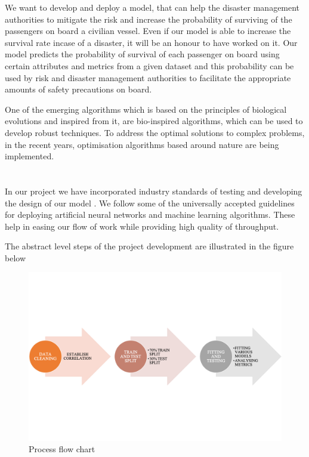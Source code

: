 \documentclass[12pt]{article}
\newcommand{\nd}{\noindent}
\newcommand{\secsize}{\fontsize{15pt}{12pt}\selectfont}
\begin{document}
\nd We want to develop and deploy a model, that can help the disaster management authorities to mitigate the risk and increase the probability of surviving of the passengers on board a civilian vessel. Even if our model is able to increase the survival rate incase of a disaster, it will be an honour to have worked on it. Our model predicts the probability of survival of each passenger on board using certain attributes and metrics from a given dataset and this probability can be used by risk and disaster management authorities to facilitate the appropriate amounts of safety precautions on board.

\nd One of the emerging algorithms which is based on the principles of biological evolutions and inspired from it, are bio-inspired algorithms, which can be used to develop robust techniques. To address the optimal solutions to complex problems, in the recent years, optimisation algorithms based around nature are being implemented. 

\newpage 
\section{\textbf{\secsize{SYSTEM METHODOLOGY}}}
In our project we have incorporated industry standards of testing and developing the design of our model . We follow some of the universally accepted guidelines for deploying artificial neural networks and machine learning algorithms. These help in easing our flow of work while providing high quality of throughput.

\nd The abstract level steps of the project development are illustrated in the figure below 

\begin{center}
\begin{figure}[h]
\centerline{\includegraphics[scale=.6]{flow.png}}
\caption{Process flow chart}
\end{figure}
\end{center}
\end{document}
